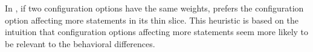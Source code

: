 In \ourtool, if two configuration options have the
same weights, \ourtool prefers the configuration option
affecting more statements in its thin slice. This heuristic
is based on the intuition that configuration options affecting
more statements seem more likely to be relevant to the behavioral
differences.












%



